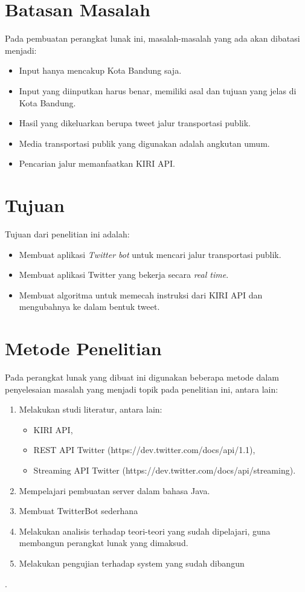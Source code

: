\section{Batasan Masalah}
Pada pembuatan perangkat lunak ini, masalah-masalah yang ada akan dibatasi menjadi:
\begin{itemize}
	\item Input hanya mencakup Kota Bandung saja.
	\item Input yang diinputkan harus benar, memiliki asal dan tujuan yang jelas di Kota Bandung.
	\item Hasil yang dikeluarkan berupa tweet jalur transportasi publik.
	\item Media transportasi publik yang digunakan adalah angkutan umum.
	\item Pencarian jalur memanfaatkan KIRI API.
\end{itemize}

\section{Tujuan}
Tujuan dari penelitian ini adalah:
\begin{itemize}
	\item Membuat aplikasi \textit{Twitter bot} untuk mencari jalur transportasi publik.
	\item Membuat aplikasi Twitter yang bekerja secara \textit{real time}.
	\item Membuat algoritma untuk memecah instruksi dari KIRI API dan mengubahnya ke dalam bentuk tweet.
\end{itemize}

\section{Metode Penelitian}
Pada perangkat lunak yang dibuat ini digunakan beberapa metode dalam penyelesaian masalah yang menjadi topik pada penelitian ini, antara lain:
\begin{enumerate}
	\item Melakukan studi literatur, antara lain:
	\begin{itemize}
		\item KIRI API,
		\item REST API Twitter (https://dev.twitter.com/docs/api/1.1),
		\item Streaming API Twitter (https://dev.twitter.com/docs/api/streaming).
	\end{itemize}
	\item Mempelajari pembuatan server dalam bahasa Java.
	\item Membuat TwitterBot sederhana
	\item Melakukan analisis terhadap teori-teori yang sudah dipelajari, guna membangun perangkat lunak yang dimaksud.
	\item Melakukan pengujian terhadap system yang sudah dibangun
\end{enumerate}.

